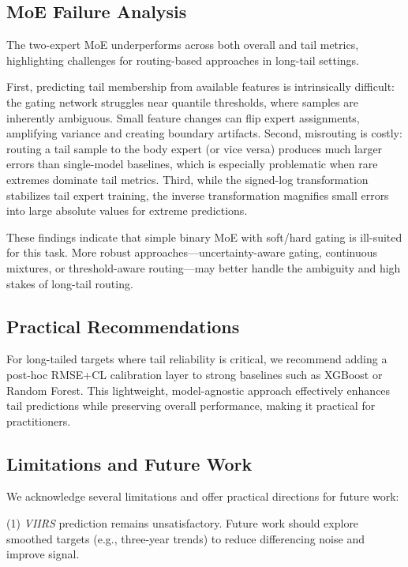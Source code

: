 \documentclass[pdflatex,sn-basic,Numbered]{sn-jnl}
\begin{document}
\subsection{MoE Failure Analysis}

The two-expert MoE underperforms across both overall and tail metrics, highlighting challenges for routing-based approaches in long-tail settings.

First, predicting tail membership from available features is intrinsically difficult: the gating network struggles near quantile thresholds, where samples are inherently ambiguous. Small feature changes can flip expert assignments, amplifying variance and creating boundary artifacts. Second, misrouting is costly: routing a tail sample to the body expert (or vice versa) produces much larger errors than single-model baselines, which is especially problematic when rare extremes dominate tail metrics. Third, while the signed-log transformation stabilizes tail expert training, the inverse transformation magnifies small errors into large absolute values for extreme predictions.

These findings indicate that simple binary MoE with soft/hard gating is ill-suited for this task. More robust approaches—uncertainty-aware gating, continuous mixtures, or threshold-aware routing—may better handle the ambiguity and high stakes of long-tail routing.

\subsection{Practical Recommendations}

For long-tailed targets where tail reliability is critical, we recommend adding a post-hoc RMSE+CL calibration layer to strong baselines such as XGBoost or Random Forest. This lightweight, model-agnostic approach effectively enhances tail predictions while preserving overall performance, making it practical for practitioners.

\subsection{Limitations and Future Work}

We acknowledge several limitations and offer practical directions for future work:

(1) \textit{VIIRS} prediction remains unsatisfactory. Future work should explore smoothed targets (e.g., three-year trends) to reduce differencing noise and improve signal.
\end{document}
